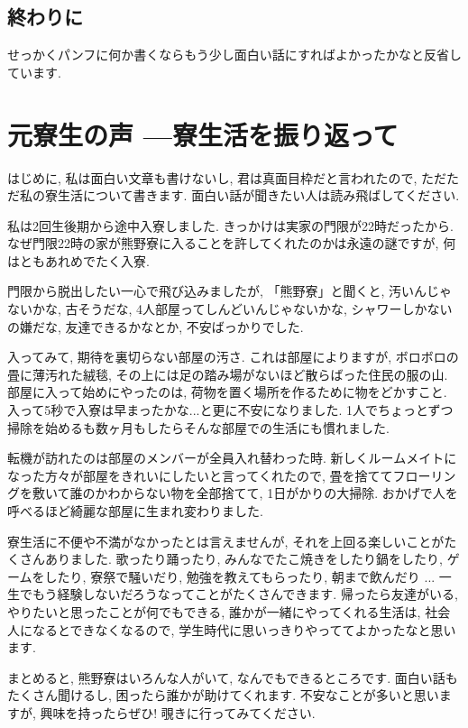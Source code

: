 \documentclass[10pt,b5jsbook,dvips,dvipdfmx,openany]{jsbook}
\theoremstyle{definition}
\begin{document}
		\subsection{終わりに}
		せっかくパンフに何か書くならもう少し面白い話にすればよかったかなと反省しています.



	\section{元寮生の声 ---寮生活を振り返って}
	 はじめに, 私は面白い文章も書けないし, 君は真面目枠だと言われたので, ただただ私の寮生活について書きます. 面白い話が聞きたい人は読み飛ばしてください.

 	私は2回生後期から途中入寮しました. きっかけは実家の門限が22時だったから. なぜ門限22時の家が熊野寮に入ることを許してくれたのかは永遠の謎ですが, 何はともあれめでたく入寮.

	 門限から脱出したい一心で飛び込みましたが, 「熊野寮」と聞くと, 汚いんじゃないかな, 古そうだな, 4人部屋ってしんどいんじゃないかな, シャワーしかないの嫌だな, 友達できるかなとか, 不安ばっかりでした.

 	入ってみて, 期待を裏切らない部屋の汚さ. これは部屋によりますが, ボロボロの畳に薄汚れた絨毯, その上には足の踏み場がないほど散らばった住民の服の山. 部屋に入って始めにやったのは, 荷物を置く場所を作るために物をどかすこと. 入って5秒で入寮は早まったかな...と更に不安になりました. 1人でちょっとずつ掃除を始めるも数ヶ月もしたらそんな部屋での生活にも慣れました.

 	転機が訪れたのは部屋のメンバーが全員入れ替わった時. 新しくルームメイトになった方々が部屋をきれいにしたいと言ってくれたので, 畳を捨ててフローリングを敷いて誰のかわからない物を全部捨てて, 1日がかりの大掃除. おかげで人を呼べるほど綺麗な部屋に生まれ変わりました.

 	寮生活に不便や不満がなかったとは言えませんが, それを上回る楽しいことがたくさんありました. 歌ったり踊ったり, みんなでたこ焼きをしたり鍋をしたり, ゲームをしたり, 寮祭で騒いだり, 勉強を教えてもらったり, 朝まで飲んだり ... 一生でもう経験しないだろうなってことがたくさんできます. 帰ったら友達がいる, やりたいと思ったことが何でもできる, 誰かが一緒にやってくれる生活は, 社会人になるとできなくなるので, 学生時代に思いっきりやっててよかったなと思います.

	まとめると, 熊野寮はいろんな人がいて, なんでもできるところです. 面白い話もたくさん聞けるし, 困ったら誰かが助けてくれます. 不安なことが多いと思いますが, 興味を持ったらぜひ! 覗きに行ってみてください.
\end{document}
